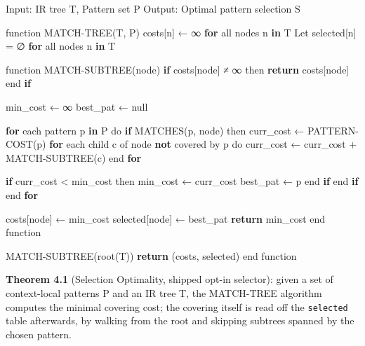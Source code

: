 \documentclass[
  11pt,
]{article}
\newenvironment{Shaded}{}{}
\newcommand{\BuiltInTok}[1]{\textcolor[rgb]{0.00,0.50,0.00}{#1}}
\newcommand{\ControlFlowTok}[1]{\textcolor[rgb]{0.00,0.44,0.13}{\textbf{#1}}}
\newcommand{\KeywordTok}[1]{\textcolor[rgb]{0.00,0.44,0.13}{\textbf{#1}}}
\newcommand{\NormalTok}[1]{#1}
\newcommand{\OperatorTok}[1]{\textcolor[rgb]{0.40,0.40,0.40}{#1}}
\begin{document}
\begin{Shaded}
\begin{Highlighting}[]
\NormalTok{Input: IR tree T, Pattern }\BuiltInTok{set}\NormalTok{ P}
\NormalTok{Output: Optimal pattern selection S}

\NormalTok{function MATCH}\OperatorTok{{-}}\NormalTok{TREE(T, P)}
\NormalTok{    costs[n] ← ∞ }\ControlFlowTok{for} \BuiltInTok{all}\NormalTok{ nodes n }\KeywordTok{in}\NormalTok{ T}
\NormalTok{    Let selected[n] }\OperatorTok{=}\NormalTok{ ∅ }\ControlFlowTok{for} \BuiltInTok{all}\NormalTok{ nodes n }\KeywordTok{in}\NormalTok{ T}
    
\NormalTok{    function MATCH}\OperatorTok{{-}}\NormalTok{SUBTREE(node)}
        \ControlFlowTok{if}\NormalTok{ costs[node] ≠ ∞ then}
            \ControlFlowTok{return}\NormalTok{ costs[node]}
\NormalTok{        end }\ControlFlowTok{if}
        
\NormalTok{        min\_cost ← ∞}
\NormalTok{        best\_pat ← null}
        
        \ControlFlowTok{for}\NormalTok{ each pattern p }\KeywordTok{in}\NormalTok{ P do}
            \ControlFlowTok{if}\NormalTok{ MATCHES(p, node) then}
\NormalTok{                curr\_cost ← PATTERN}\OperatorTok{{-}}\NormalTok{COST(p)}
                \ControlFlowTok{for}\NormalTok{ each child c of node }\KeywordTok{not}\NormalTok{ covered by p do}
\NormalTok{                    curr\_cost ← curr\_cost }\OperatorTok{+}\NormalTok{ MATCH}\OperatorTok{{-}}\NormalTok{SUBTREE(c)}
\NormalTok{                end }\ControlFlowTok{for}
                
                \ControlFlowTok{if}\NormalTok{ curr\_cost }\OperatorTok{\textless{}}\NormalTok{ min\_cost then}
\NormalTok{                    min\_cost ← curr\_cost}
\NormalTok{                    best\_pat ← p}
\NormalTok{                end }\ControlFlowTok{if}
\NormalTok{            end }\ControlFlowTok{if}
\NormalTok{        end }\ControlFlowTok{for}
        
\NormalTok{        costs[node] ← min\_cost}
\NormalTok{        selected[node] ← best\_pat}
        \ControlFlowTok{return}\NormalTok{ min\_cost}
\NormalTok{    end function}
    
\NormalTok{    MATCH}\OperatorTok{{-}}\NormalTok{SUBTREE(root(T))}
    \ControlFlowTok{return}\NormalTok{ (costs, selected)}
\NormalTok{end function}
\end{Highlighting}
\end{Shaded}

\textbf{Theorem 4.1} (Selection Optimality, shipped opt-in selector):
given a set of context-local patterns P and an IR tree T, the MATCH-TREE
algorithm computes the minimal covering cost; the covering itself is
read off the \texttt{selected} table afterwards, by walking from the
root and skipping subtrees spanned by the chosen pattern.
\end{document}
